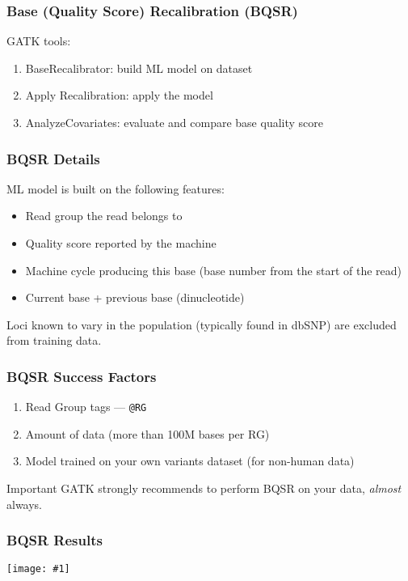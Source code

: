 \documentclass{beamer}
\newcommand {\framedgraphic}[1] {
\begin{center}
\texttt{[image: \#1]}
\end{center}
}
\begin{document}
\begin{frame}
\frametitle{Base (Quality Score) Recalibration (BQSR)}

GATK tools:

\begin{enumerate}
\item BaseRecalibrator: build ML model on dataset
\item Apply Recalibration: apply the model
\item AnalyzeCovariates: evaluate and compare base quality score
\end{enumerate}

\end{frame}

\begin{frame}
\frametitle{BQSR Details}

ML model is built on the following features:
\begin{itemize}
\item Read group the read belongs to
\item Quality score reported by the machine
\item Machine cycle producing this base (base number from the start of the read)
\item Current base + previous base (dinucleotide)
\end{itemize}
Loci known to vary in the population (typically found in dbSNP) are excluded from training data.

\end{frame}

\begin{frame}
\frametitle{BQSR Success Factors}

\begin{enumerate}
\item Read Group tags --- \texttt{@RG}
\item Amount of data (more than 100M bases per RG)
\item Model trained on your own variants dataset (for non-human data)
\end{enumerate}

\begin{alertblock}{Important}
GATK strongly recommends to perform BQSR on your data, \textit{almost} always.
\end{alertblock}

\end{frame}

\begin{frame}
\frametitle{BQSR Results}
\framedgraphic{qual.png}
\end{frame}
\end{document}
